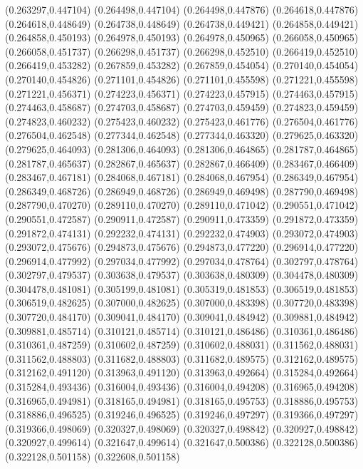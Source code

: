 (0.263297,0.447104)
(0.264498,0.447104)
(0.264498,0.447876)
(0.264618,0.447876)
(0.264618,0.448649)
(0.264738,0.448649)
(0.264738,0.449421)
(0.264858,0.449421)
(0.264858,0.450193)
(0.264978,0.450193)
(0.264978,0.450965)
(0.266058,0.450965)
(0.266058,0.451737)
(0.266298,0.451737)
(0.266298,0.452510)
(0.266419,0.452510)
(0.266419,0.453282)
(0.267859,0.453282)
(0.267859,0.454054)
(0.270140,0.454054)
(0.270140,0.454826)
(0.271101,0.454826)
(0.271101,0.455598)
(0.271221,0.455598)
(0.271221,0.456371)
(0.274223,0.456371)
(0.274223,0.457915)
(0.274463,0.457915)
(0.274463,0.458687)
(0.274703,0.458687)
(0.274703,0.459459)
(0.274823,0.459459)
(0.274823,0.460232)
(0.275423,0.460232)
(0.275423,0.461776)
(0.276504,0.461776)
(0.276504,0.462548)
(0.277344,0.462548)
(0.277344,0.463320)
(0.279625,0.463320)
(0.279625,0.464093)
(0.281306,0.464093)
(0.281306,0.464865)
(0.281787,0.464865)
(0.281787,0.465637)
(0.282867,0.465637)
(0.282867,0.466409)
(0.283467,0.466409)
(0.283467,0.467181)
(0.284068,0.467181)
(0.284068,0.467954)
(0.286349,0.467954)
(0.286349,0.468726)
(0.286949,0.468726)
(0.286949,0.469498)
(0.287790,0.469498)
(0.287790,0.470270)
(0.289110,0.470270)
(0.289110,0.471042)
(0.290551,0.471042)
(0.290551,0.472587)
(0.290911,0.472587)
(0.290911,0.473359)
(0.291872,0.473359)
(0.291872,0.474131)
(0.292232,0.474131)
(0.292232,0.474903)
(0.293072,0.474903)
(0.293072,0.475676)
(0.294873,0.475676)
(0.294873,0.477220)
(0.296914,0.477220)
(0.296914,0.477992)
(0.297034,0.477992)
(0.297034,0.478764)
(0.302797,0.478764)
(0.302797,0.479537)
(0.303638,0.479537)
(0.303638,0.480309)
(0.304478,0.480309)
(0.304478,0.481081)
(0.305199,0.481081)
(0.305319,0.481853)
(0.306519,0.481853)
(0.306519,0.482625)
(0.307000,0.482625)
(0.307000,0.483398)
(0.307720,0.483398)
(0.307720,0.484170)
(0.309041,0.484170)
(0.309041,0.484942)
(0.309881,0.484942)
(0.309881,0.485714)
(0.310121,0.485714)
(0.310121,0.486486)
(0.310361,0.486486)
(0.310361,0.487259)
(0.310602,0.487259)
(0.310602,0.488031)
(0.311562,0.488031)
(0.311562,0.488803)
(0.311682,0.488803)
(0.311682,0.489575)
(0.312162,0.489575)
(0.312162,0.491120)
(0.313963,0.491120)
(0.313963,0.492664)
(0.315284,0.492664)
(0.315284,0.493436)
(0.316004,0.493436)
(0.316004,0.494208)
(0.316965,0.494208)
(0.316965,0.494981)
(0.318165,0.494981)
(0.318165,0.495753)
(0.318886,0.495753)
(0.318886,0.496525)
(0.319246,0.496525)
(0.319246,0.497297)
(0.319366,0.497297)
(0.319366,0.498069)
(0.320327,0.498069)
(0.320327,0.498842)
(0.320927,0.498842)
(0.320927,0.499614)
(0.321647,0.499614)
(0.321647,0.500386)
(0.322128,0.500386)
(0.322128,0.501158)
(0.322608,0.501158)
